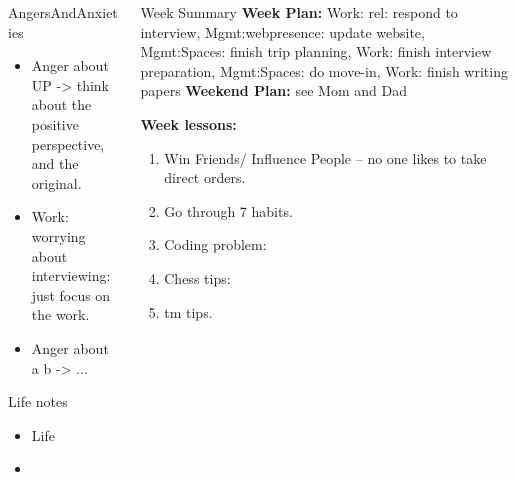 \documentclass[serif, mathserif, final]{beamer}
\begin{document}
\begin{frame}
\begin{columns}
\begin{column}{0.25\linewidth}
      \begin{block}{AngersAndAnxieties}
        \begin{itemize}
          \item \tiny Anger about UP -> think about the positive
            perspective, and the original.
          \tiny \item \tiny Work: worrying about interviewing: just
          focus on the work. 
          \item \tiny Anger about a b  -> ...
        \end{itemize}
      \end{block}
      \begin{block}{Life notes}
        \begin{itemize}
        \tiny \item \tiny Life 
        \item \tiny 
        \end{itemize}
      \end{block} 
\end{column}


\begin{column}{0.5\linewidth} 
      \begin{block}{Week Summary}
        {\tiny \textbf{Week Plan:}  Work: rel: respond to interview,
          Mgmt:webpresence: update website, 
          Mgmt:Spaces: finish trip planning, 
          Work: finish interview preparation, 
          Mgmt:Spaces: do move-in, Work: finish writing papers}
        {\tiny \textbf{Weekend Plan:}  see Mom and Dad} 

        {\tiny {\bf Week lessons:}}

        \begin{enumerate}
          \tiny \item \tiny Win Friends/ Influence People – no one
          likes to take direct orders.
        \item \tiny Go through 7 habits.
        \item \tiny Coding problem: 
        \item \tiny Chess tips: 
        \item \tiny tm tips. 
        \end{enumerate} 


\end{block}
\end{column}
\end{columns}
\end{frame}
\end{document}
